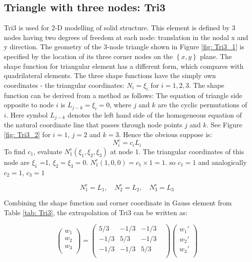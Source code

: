 \subsection{Triangle with three nodes: Tri3}
Tri3 is used for 2-D modelling of solid structure. This element is defined by 3 nodes having two degrees of freedom at each node: translation in the nodal x and y direction. The geometry of the 3-node triangle shown in Figure \ref{fig: Tri3_1} is specified by the location of its three corner nodes on the $\left\{x, y\right\}$ plane. The shape function for triangular element has a different form, which compares with quadrilateral elements. The three shape functions have the simply own coordinates - the triangular coordinates: $N_i = \xi_i$ for $i = 1, 2, 3.$ The shape function can be derived from a method as follows: The equation of triangle side opposite to node $i$ is $L_{j-k} = \xi_i = 0$, where $j$ and $k$ are the cyclic permutations of $i$. Here symbol $L_{j-k}$ denotes the left hand side of the homogeneous equation of the natural coordinate line that passes through node points $j$ and $k$. See Figure \ref{fig: Tri3_2} for $i = 1$, $j=2$ and $k = 3$. Hence the obvious suppose is:
\begin{equation}
N_i^e = c_iL_i
\end{equation}
To find $c_1$, evaluate $N_1^e\left(\xi_1, \xi_2, \xi_3\right)$ at node 1. The triangular coordinates of this node are $\xi_1$ =1, $\xi_2 = \xi_3 = 0$.  $N_1^e\left(1,0,0\right) = c_1 \times 1 = 1$. so $c_1 = 1$ and analogically $c_2 = 1$, $c_3 = 1$

\begin{equation}
N_1^e = L_1 , \quad N_2^e = L_2, \quad N_3^e = L_3
\end{equation}

Combining the shape function and corner coordinate in Gauss element from Table \ref{tab: Tri3}, the extrapolation of Tri3 can be written as:

\begin{equation}
\begin{pmatrix}
w_1 \\
w_2 \\
w_3 \\
\end{pmatrix} = \begin{pmatrix}
5/3 & -1/3 & -1/3 &    \\
-1/3 & 5/3 & -1/3 &    \\
-1/3 & -1/3 & 5/3 &    \\
\end{pmatrix} \begin{pmatrix}
{w_1}' \\
{w_2}' \\
{w_3}' \\
\end{pmatrix}
\end{equation}

